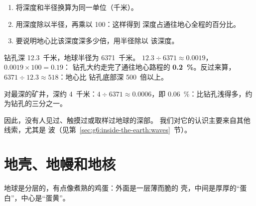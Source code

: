 \begin{method}[比较深度与地球半径]\label{met:g6:inside-the-earth:percent}
\begin{enumerate}
  \item 将深度和半径换算为同一单位（千米）。
  \item 用深度除以半径，再乘以 100：这样得到
        深度占通往地心全程的百分比。
  \item 要说明地心比该深度深多少倍，用半径除以
        该深度。
\end{enumerate}
\end{method}

\begin{example}[最深的钻孔]\label{ex:g6:inside-the-earth:kola}
钻孔深 12.3~千米，地球半径为 6371~千米。
$12.3 \div 6371 \approx 0.0019$，$0.0019 \times 100 = 0.19$：
钻孔大约走完了通往地心路程的 \textbf{0.2~\%}。反过来算，
$6371 \div 12.3 \approx 518$：地心比
钻孔底部深 500~倍以上。

对最深的矿井，深约 4~千米：$4 \div 6371 \approx 0.0006$，即
0.06~\%：比钻孔浅得多，约为钻孔的三分之一。
\end{example}

因此，没有人见过、触摸过或取样过地球的深部。
我们对它的认识主要来自其他线索，尤其是
波（见第~\ref{sec:g6:inside-the-earth:waves}~节）。

\section{地壳、地幔和地核}

地球是分层的，有点像煮熟的鸡蛋：外面是一层薄而脆的
壳，中间是厚厚的“蛋白”，中心是“蛋黄”。

